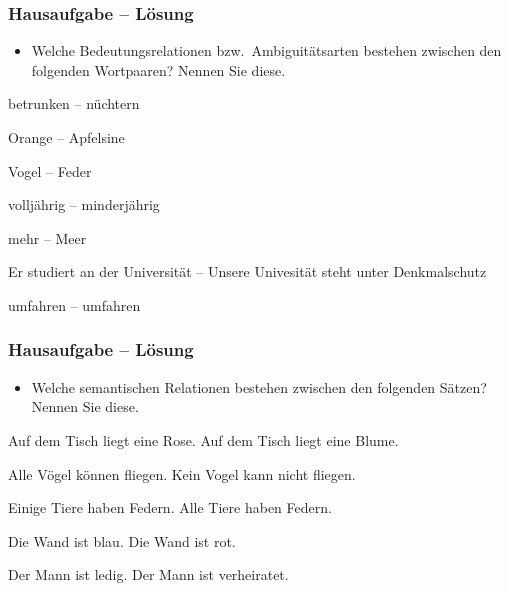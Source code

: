 \begin{frame}
\frametitle{Hausaufgabe -- Lösung}

\begin{itemize}
\item Welche Bedeutungsrelationen bzw.\ Ambiguitätsarten bestehen zwischen den folgenden Wortpaaren? Nennen Sie diese.
\end{itemize}

\settowidth{}
\ea 
	\ea betrunken -- nüchtern \pause 
	
	\ex Orange -- Apfelsine \pause 
	
	\ex Vogel -- Feder \pause 
	
	
	\ex volljährig -- minderjährig \pause 
	
	\ex mehr -- Meer \pause 
	
	\ex Er studiert an der Universität -- Unsere Univesität steht unter Denkmalschutz \pause
	
	\ex umfahren -- umfahren \pause
	\z
\z 

\end{frame}


\begin{frame}
\frametitle{Hausaufgabe -- Lösung}

\begin{itemize}
	\item Welche semantischen Relationen bestehen zwischen den folgenden Sätzen? Nennen Sie diese.
\end{itemize}

\settowidth{}
\ea 
\ea Auf dem Tisch liegt eine Rose.
\ex Auf dem Tisch liegt eine Blume.
\pause 
{}
\z 

\pause 
\medskip

\ex 	
\ea Alle Vögel können fliegen.
\ex Kein Vogel kann nicht fliegen.
\pause 
{}
\z 

\pause 
\medskip

\ex 	
\ea Einige Tiere haben Federn.
\ex Alle Tiere haben Federn.
\pause 
{}
\z

\pause
\medskip

\ex
\ea Die Wand ist blau.
\ex Die Wand ist rot.
\pause
{}
\z

\pause
\medskip

\ex
\ea Der Mann ist ledig.
\ex Der Mann ist verheiratet.
\pause
{}
\z

\z 

\end{frame}


